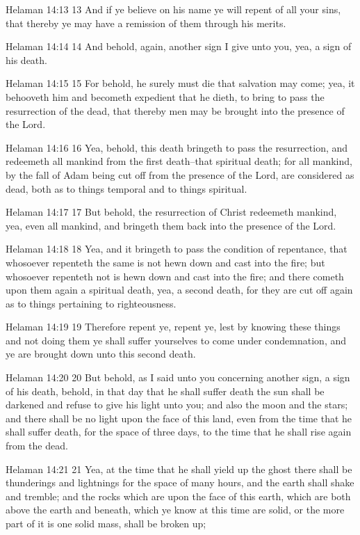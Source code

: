 Helaman 14:13
 13 And if ye believe on his name ye will repent of all your
sins, that thereby ye may have a remission of them through his
merits.

Helaman 14:14
 14 And behold, again, another sign I give unto you, yea, a sign
of his death.

Helaman 14:15
 15 For behold, he surely must die that salvation may come; yea,
it behooveth him and becometh expedient that he dieth, to bring
to pass the resurrection of the dead, that thereby men may be
brought into the presence of the Lord.

Helaman 14:16
 16 Yea, behold, this death bringeth to pass the resurrection,
and redeemeth all mankind from the first death--that spiritual
death; for all mankind, by the fall of Adam being cut off from
the presence of the Lord, are considered as dead, both as to
things temporal and to things spiritual.

Helaman 14:17
 17 But behold, the resurrection of Christ redeemeth mankind,
yea, even all mankind, and bringeth them back into the presence
of the Lord.

Helaman 14:18
 18 Yea, and it bringeth to pass the condition of repentance,
that whosoever repenteth the same is not hewn down and cast into
the fire; but whosoever repenteth not is hewn down and cast into
the fire; and there cometh upon them again a spiritual death,
yea, a second death, for they are cut off again as to things
pertaining to righteousness.

Helaman 14:19
 19 Therefore repent ye, repent ye, lest by knowing these things
and not doing them ye shall suffer yourselves to come under
condemnation, and ye are brought down unto this second death.

Helaman 14:20
 20 But behold, as I said unto you concerning another sign, a
sign of his death, behold, in that day that he shall suffer death
the sun shall be darkened and refuse to give his light unto you;
and also the moon and the stars; and there shall be no light upon
the face of this land, even from the time that he shall suffer
death, for the space of three days, to the time that he shall
rise again from the dead.

Helaman 14:21
 21 Yea, at the time that he shall yield up the ghost there shall
be thunderings and lightnings for the space of many hours, and
the earth shall shake and tremble; and the rocks which are upon
the face of this earth, which are both above the earth and
beneath, which ye know at this time are solid, or the more part
of it is one solid mass, shall be broken up;

